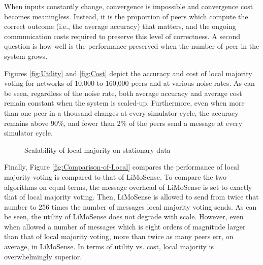 \documentclass[12pt,english,journal]{elsarticle}
\numberwithin{equation}{section}
\numberwithin{figure}{section}
\theoremstyle{plain}
\theoremstyle{plain}
\begin{document}
When inputs constantly change, convergence is impossible and convergence
cost becomes meaningless. Instead, it is the proportion of peers which
compute the correct outcome (i.e., the average accuracy) that matters,
and the ongoing communication costs required to preserve this level
of correctness. A second question is how well is the performance preserved
when the number of peer in the system grows.

Figures \ref{fig:Utility} and \ref{fig:Cost} depict the accuracy
and cost of local majority voting for networks of 10,000 to 160,000
peers and at various noise rates. As can be seen, regardless of the
noise rate, both average accuracy and average cost remain constant
when the system is scaled-up. Furthermore, even when more than one
peer in a thousand changes at every simulator cycle, the accuracy
remains above 90\%, and fewer than 2\% of the peers send a message
at every simulator cycle. 

\begin{figure}[p]
\caption{\label{fig:Scalability}Scalability of local majority on stationary
data}


\begin{minipage}[t]{0.5\textwidth}\end{minipage}\begin{minipage}[t]{0.5\textwidth}\end{minipage}

\centering{}\begin{minipage}[t]{0.5\textwidth}\end{minipage}
\end{figure}


Finally, Figure \ref{fig:Comparison-of-Local} compares the performance
of local majority voting is compared to that of LiMoSense. To compare
the two algorithms on equal terms, the message overhead of LiMoSense
is set to exactly that of local majority voting. Then, LiMoSense is
allowed to send from twice that number to 256 times the number of
messages local majority voting sends. As can be seen, the utility
of LiMoSense does not degrade with scale. However, even when allowed
a number of messages which is eight orders of magnitude larger than
that of local majority voting, more than twice as many peers err,
on average, in LiMoSense. In terms of utility vs. cost, local majority
is overwhelmingly superior.
\end{document}
